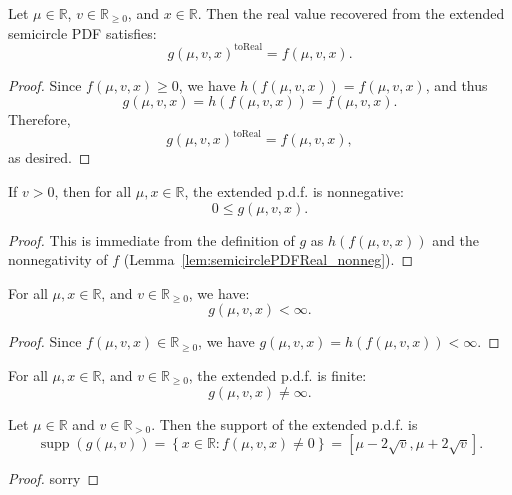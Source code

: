 \begin{lemma}
\label{lem:semicirclePDF_toReal}
Let \( \mu \in \mathbb{R} \), \( v \in \mathbb{R}_{\ge 0} \), and \( x \in \mathbb{R} \).
Then the real value recovered from the extended semicircle PDF satisfies:
\[
g(\mu, v, x)^{\operatorname{toReal}} = f(\mu, v, x).
\]
\end{lemma}
\begin{proof}
Since \( f(\mu, v, x) \ge 0 \), we have \( h(f(\mu, v, x)) = f(\mu, v, x) \), and thus
\[
g(\mu, v, x) = h(f(\mu, v, x)) = f(\mu, v, x).
\]
Therefore,
\[
g(\mu, v, x)^{\operatorname{toReal}} = f(\mu, v, x),
\]
as desired.
\end{proof}

\begin{lemma}
  \label{lem:semicirclePDF_nonneg}
  If $v > 0$, then for all $\mu, x \in \mathbb{R}$, the extended p.d.f. is nonnegative:
  \[
    0 \le g(\mu,v,x).
  \]
\end{lemma}
\begin{proof}
  This is immediate from the definition of $g$ as $h(f(\mu,v,x))$ and the nonnegativity of $f$ (Lemma~\ref{lem:semicirclePDFReal_nonneg}).
\end{proof}

\begin{lemma}
  \label{lem:semicirclePDF_finite}
  For all $\mu, x \in \mathbb{R}$, and $v \in \mathbb{R}_{\ge 0}$, we have:
    $$ 
    g(\mu,v,x) < \infty.
    $$ 
\end{lemma}
\begin{proof}
  Since $f(\mu,v,x) \in \mathbb{R}_{\ge 0}$, we have $g(\mu,v,x) = h(f(\mu,v,x)) < \infty$.
\end{proof}

\begin{lemma}
  \label{lem:semicirclePDF_ne_top}
  For all \( \mu, x \in \mathbb{R} \), and \( v \in \mathbb{R}_{\ge 0} \), the extended p.d.f. is finite:
  \[
    g(\mu,v,x) \ne \infty.
  \]
\end{lemma}

\begin{lemma}
  \label{lem:support_semicirclePDF}
  Let \( \mu \in \mathbb{R} \) and \( v \in \mathbb{R}_{> 0} \). Then the support of the extended p.d.f. is
  \[
    \operatorname{supp}(g(\mu,v)) = \left\{ x \in \mathbb{R} : f(\mu,v,x) \ne 0 \right\}
    = \left[ \mu - 2\sqrt{v}, \mu + 2\sqrt{v} \right].
  \]
\end{lemma}
\begin{proof}
    sorry
\end{proof}

